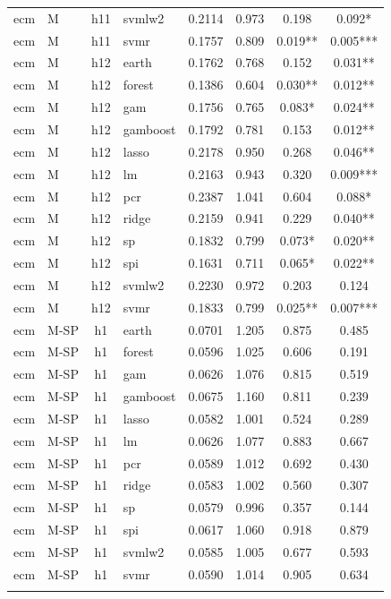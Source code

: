 \begin{ThreePartTable}
\begin{longtable}[t]{llclcccc}
ecm & M & h11 & svmlw2 & 0.2114 & 0.973 & 0.198 & 0.092*\\
ecm & M & h11 & svmr & 0.1757 & 0.809 & 0.019** & 0.005***\\
\addlinespace
ecm & M & h12 & earth & 0.1762 & 0.768 & 0.152 & 0.031**\\
ecm & M & h12 & forest & 0.1386 & 0.604 & 0.030** & 0.012**\\
ecm & M & h12 & gam & 0.1756 & 0.765 & 0.083* & 0.024**\\
ecm & M & h12 & gamboost & 0.1792 & 0.781 & 0.153 & 0.012**\\
ecm & M & h12 & lasso & 0.2178 & 0.950 & 0.268 & 0.046**\\
ecm & M & h12 & lm & 0.2163 & 0.943 & 0.320 & 0.009***\\
ecm & M & h12 & pcr & 0.2387 & 1.041 & 0.604 & 0.088*\\
ecm & M & h12 & ridge & 0.2159 & 0.941 & 0.229 & 0.040**\\
ecm & M & h12 & sp & 0.1832 & 0.799 & 0.073* & 0.020**\\
ecm & M & h12 & spi & 0.1631 & 0.711 & 0.065* & 0.022**\\
ecm & M & h12 & svmlw2 & 0.2230 & 0.972 & 0.203 & 0.124\\
ecm & M & h12 & svmr & 0.1833 & 0.799 & 0.025** & 0.007***\\
\addlinespace
ecm & M-SP & h1 & earth & 0.0701 & 1.205 & 0.875 & 0.485\\
ecm & M-SP & h1 & forest & 0.0596 & 1.025 & 0.606 & 0.191\\
ecm & M-SP & h1 & gam & 0.0626 & 1.076 & 0.815 & 0.519\\
ecm & M-SP & h1 & gamboost & 0.0675 & 1.160 & 0.811 & 0.239\\
ecm & M-SP & h1 & lasso & 0.0582 & 1.001 & 0.524 & 0.289\\
ecm & M-SP & h1 & lm & 0.0626 & 1.077 & 0.883 & 0.667\\
ecm & M-SP & h1 & pcr & 0.0589 & 1.012 & 0.692 & 0.430\\
ecm & M-SP & h1 & ridge & 0.0583 & 1.002 & 0.560 & 0.307\\
ecm & M-SP & h1 & sp & 0.0579 & 0.996 & 0.357 & 0.144\\
ecm & M-SP & h1 & spi & 0.0617 & 1.060 & 0.918 & 0.879\\
ecm & M-SP & h1 & svmlw2 & 0.0585 & 1.005 & 0.677 & 0.593\\
ecm & M-SP & h1 & svmr & 0.0590 & 1.014 & 0.905 & 0.634\\
\addlinespace

\end{longtable}
\end{ThreePartTable}
